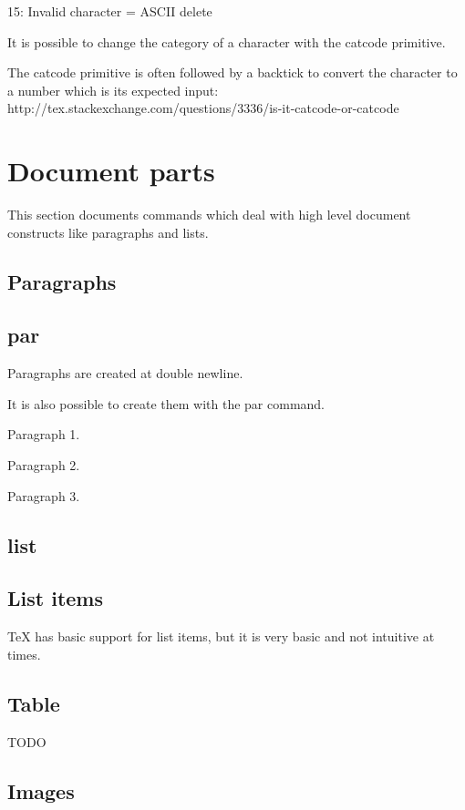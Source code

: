   15: Invalid character = ASCII delete

  It is possible to change the category of a character with the \bs catcode primitive.

  The catcode primitive is often followed by a backtick to convert the character to a number which is its expected input: http://tex.stackexchange.com/questions/3336/is-it-catcode-or-catcode

\section{Document parts}

  This section documents commands which deal with high level document constructs like paragraphs and lists.

  \subsection{Paragraphs}

  \subsection{par}

    Paragraphs are created at double newline.

    It is also possible to create them with the \bs par command.

    Paragraph 1. \par
    Paragraph 2. \par
    Paragraph 3. \par

  \subsection{list}

  \subsection{List items}

    TeX has basic support for list items, but it is very basic and not intuitive at times.

  \subsection{Table}

    TODO

  \subsection{Images}

